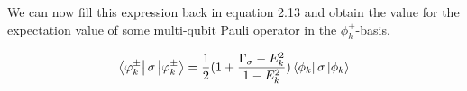 We can now fill this expression back in equation 2.13 and obtain the value for the expectation value of some multi-qubit Pauli operator in the $\phi^{\pm}_k$-basis.


$$
\left\langle{\varphi_k^{\pm}}\right\vert \sigma \left\vert{\varphi_k^{\pm}}\right\rangle = \frac{1}{2}(1+\frac{\Gamma_{\sigma} - E_k^2}{1-E_k^2})  \left\langle{\phi_k}\right\vert \sigma \left\vert{\phi_k}\right\rangle
$$
